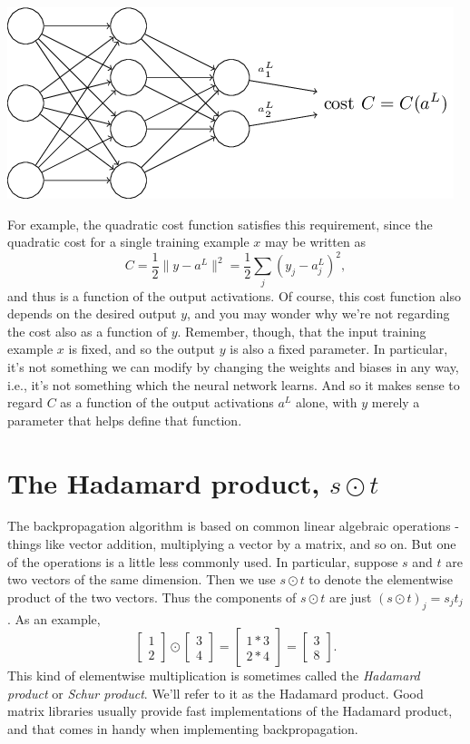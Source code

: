 \documentclass[a4paper,twoside,10pt]{book}
\begin{document}
\begin{center}
\includegraphics[width=0.7\linewidth]{./figures/ch2/tikz18}
\end{center}
For example, the quadratic cost function satisfies this requirement, since the quadratic cost for a single training example $x$ may be written as
\begin{equation}
C = \frac{1}{2} \|y-a^L\|^2 = \frac{1}{2} \sum_j (y_j-a^L_j)^2,
\label{eq:27}
\end{equation}
and thus is a function of the output activations. Of course, this cost function also depends on the desired output $y$, and you may wonder why we're not regarding the cost also as a function of $y$. Remember, though, that the input training example $x$ is fixed, and so the output $y$ is also a fixed parameter. In particular, it's not something we can modify by changing the weights and biases in any way, i.e., it's not something which the neural network learns. And so it makes sense to regard $C$ as a function of the output activations $a^L$ alone, with $y$ merely a parameter that helps define that function.
\section{The Hadamard product, $s\odot{}t$}
The backpropagation algorithm is based on common linear algebraic operations - things like vector addition, multiplying a vector by a matrix, and so on. But one of the operations is a little less commonly used. In particular, suppose $s$ and $t$ are two vectors of the same dimension. Then we use $s\odot{}t$ to denote the elementwise product of the two vectors. Thus the components of $s\odot{}t$ are just $(s \odot t)_j = s_j t_j$. As an example,
\begin{equation}
	\left[\begin{array}{c} 1 \\ 2 \end{array}\right] 
	\odot \left[\begin{array}{c} 3 \\ 4\end{array} \right]
	= \left[ \begin{array}{c} 1 * 3 \\ 2 * 4 \end{array} \right]
	= \left[ \begin{array}{c} 3 \\ 8 \end{array} \right].
	\label{eq:28}
\end{equation}
This kind of elementwise multiplication is sometimes called the \textit{Hadamard product} or \textit{Schur product}. We'll refer to it as the Hadamard product. Good matrix libraries usually provide fast implementations of the Hadamard product, and that comes in handy when implementing backpropagation.
\end{document}
